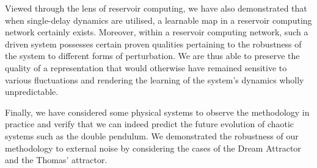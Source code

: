 Viewed through the lens of reservoir computing, we have also demonstrated that when single-delay dynamics are utilised, a learnable map in a reservoir computing network certainly exists. 
Moreover, within a reservoir computing network, such a driven system possesses certain proven qualities pertaining to the robustness of the system to different forms of perturbation. 
We are thus able to preserve the quality of a representation that would otherwise have remained sensitive to various fluctuations and rendering the learning of the system's dynamics wholly unpredictable. 


Finally, we have considered some physical systems to observe the methodology in practice and verify that we can indeed predict the future evolution of chaotic systems such as the double pendulum.
We demonstrated the robustness of our methodology to external noise by considering the cases of the  Dream Attractor and the Thomas' attractor.
